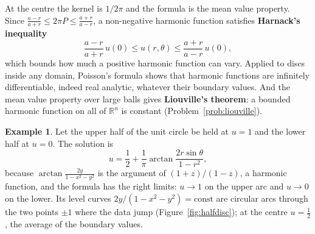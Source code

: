 \documentclass[11pt,a4paper]{article}
\numberwithin{equation}{section}
\theoremstyle{definition}
\newtheorem{exa}[thm]{Example}
\begin{document}
At the centre the kernel is $1/2\pi$ and the formula is the mean value property. Since $\frac{a - r}{a + r} \leq 2\pi P \leq \frac{a + r}{a - r}$, a non-negative harmonic function satisfies \textbf{Harnack's inequality}
\[
\frac{a - r}{a + r}\,u(0) \leq u(r, \theta) \leq \frac{a + r}{a - r}\,u(0) ,
\]
which bounds how much a positive harmonic function can vary. Applied to discs inside any domain, Poisson's formula shows that harmonic functions are infinitely differentiable, indeed real analytic, whatever their boundary values. And the mean value property over large balls gives \textbf{Liouville's theorem}: a bounded harmonic function on all of
$\mathbb R^n$ is constant (Problem~\ref{prob:liouville}).

\begin{exa}
\label{ex:halfdisc}
Let the upper half of the unit circle be held at $u = 1$ and the lower half at $u = 0$. The solution is
\[
u = \frac12 + \frac1\pi\arctan\frac{2r\sin\theta}{1 - r^2} ,
\]
because $\arctan\frac{2y}{1 - x^2 - y^2}$ is the argument of $(1 + z)/(1 - z)$, a harmonic function, and the formula has the right limits: $u \to 1$ on the upper arc and $u \to 0$ on the lower. Its level curves $2y/(1 - x^2 - y^2) = \text{const}$ are circular arcs through the two points $\pm1$ where the data jump
(Figure~\ref{fig:halfdisc}); at the centre $u = \frac12$, the average of the boundary values.
\end{exa}
\end{document}
